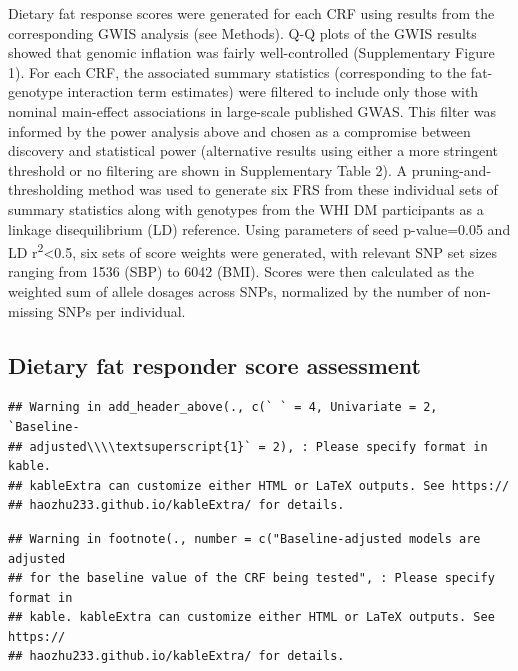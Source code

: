 \documentclass[]{article}
\begin{document}
Dietary fat response scores were generated for each CRF using results
from the corresponding GWIS analysis (see Methods). Q-Q plots of the
GWIS results showed that genomic inflation was fairly well-controlled
(Supplementary Figure 1). For each CRF, the associated summary
statistics (corresponding to the fat-genotype interaction term
estimates) were filtered to include only those with nominal main-effect
associations in large-scale published GWAS. This filter was informed by
the power analysis above and chosen as a compromise between discovery
and statistical power (alternative results using either a more stringent
threshold or no filtering are shown in Supplementary Table 2). A
pruning-and-thresholding method was used to generate six FRS from these
individual sets of summary statistics along with genotypes from the WHI
DM participants as a linkage disequilibrium (LD) reference. Using
parameters of seed p-value=0.05 and LD
r\textsuperscript{2}\textless{}0.5, six sets of score weights were
generated, with relevant SNP set sizes ranging from 1536 (SBP) to 6042
(BMI). Scores were then calculated as the weighted sum of allele dosages
across SNPs, normalized by the number of non-missing SNPs per
individual.

\hypertarget{dietary-fat-responder-score-assessment}{%
\subsection{Dietary fat responder score
assessment}\label{dietary-fat-responder-score-assessment}}

\begin{verbatim}
## Warning in add_header_above(., c(` ` = 4, Univariate = 2, `Baseline-
## adjusted\\\\textsuperscript{1}` = 2), : Please specify format in kable.
## kableExtra can customize either HTML or LaTeX outputs. See https://
## haozhu233.github.io/kableExtra/ for details.
\end{verbatim}

\begin{verbatim}
## Warning in footnote(., number = c("Baseline-adjusted models are adjusted
## for the baseline value of the CRF being tested", : Please specify format in
## kable. kableExtra can customize either HTML or LaTeX outputs. See https://
## haozhu233.github.io/kableExtra/ for details.
\end{verbatim}
\end{document}
